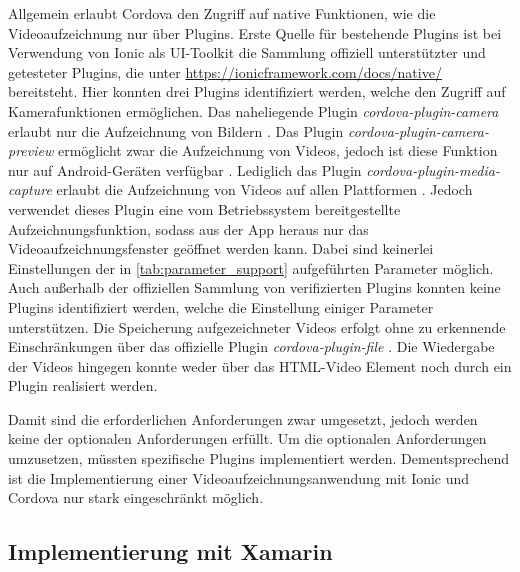 Allgemein erlaubt Cordova den Zugriff auf native Funktionen, wie die Videoaufzeichnung nur über Plugins.
Erste Quelle für bestehende Plugins ist bei Verwendung von Ionic als UI-Toolkit die Sammlung offiziell unterstützter und getesteter Plugins, die unter \url{https://ionicframework.com/docs/native/} bereitsteht.
Hier konnten drei Plugins identifiziert werden, welche den Zugriff auf Kamerafunktionen ermöglichen.
Das naheliegende Plugin \textit{cordova-plugin-camera} erlaubt nur die Aufzeichnung von Bildern \cite{Cordova_Camera}.
Das Plugin \textit{cordova-plugin-camera-preview} ermöglicht zwar die Aufzeichnung von Videos, jedoch ist diese Funktion nur auf Android-Geräten verfügbar \cite{Cordova_CameraPreview}.
Lediglich das Plugin \textit{cordova-plugin-media-capture} erlaubt die Aufzeichnung von Videos auf allen Plattformen \cite{Cordova_MediaCapture}.
Jedoch verwendet dieses Plugin eine vom Betriebssystem bereitgestellte Aufzeichnungsfunktion, sodass aus der App heraus nur das Videoaufzeichnungsfenster geöffnet werden kann.
Dabei sind keinerlei Einstellungen der in \autoref{tab:parameter_support} aufgeführten Parameter möglich.
Auch außerhalb der offiziellen Sammlung von verifizierten Plugins konnten keine Plugins identifiziert werden, welche die Einstellung einiger Parameter unterstützen.
Die Speicherung aufgezeichneter Videos erfolgt ohne zu erkennende Einschränkungen über das offizielle Plugin \textit{cordova-plugin-file} \cite{Cordova_File}.
Die Wiedergabe der Videos hingegen konnte weder über das HTML-Video Element noch durch ein Plugin realisiert werden. 

Damit sind die erforderlichen Anforderungen zwar umgesetzt, jedoch werden keine der optionalen Anforderungen erfüllt.
Um die optionalen Anforderungen umzusetzen, müssten spezifische Plugins implementiert werden.
Dementsprechend ist die Implementierung einer Videoaufzeichnungsanwendung mit Ionic und Cordova nur stark eingeschränkt möglich.


\subsection{Implementierung mit Xamarin}
\label{sec:evaluation_xamarin}

